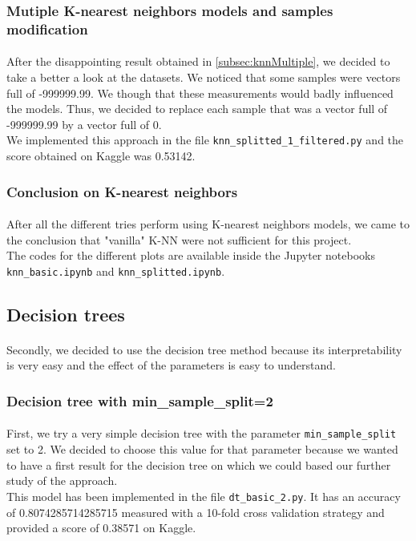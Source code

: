 \documentclass[a4paper, 11pt, oneside]{article}
\begin{document}
\subsubsection{Mutiple K-nearest neighbors models and samples modification}
\paragraph{}After the disappointing result obtained in \ref{subsec:knnMultiple}, we decided to take a better a look at the datasets. We noticed that some samples were vectors full of -999999.99. We though that these measurements would badly influenced the models. Thus, we decided to replace each sample that was a vector full of -999999.99 by a vector full of 0.\\
We implemented this approach in the file \texttt{knn\_splitted\_1\_filtered.py} and the score obtained on Kaggle was 0.53142.

\subsubsection{Conclusion on K-nearest neighbors}
\paragraph{}After all the different tries perform using K-nearest neighbors models, we came to the conclusion that "vanilla" K-NN were not sufficient for this project.\\
The codes for the different plots are available inside the Jupyter notebooks \texttt{knn\_basic.ipynb} and \texttt{knn\_splitted.ipynb}.


\subsection{Decision trees}\label{subsec:dt}
\paragraph{}Secondly, we decided to use the decision tree method because its interpretability is very easy and the effect of the parameters is easy to understand.

\subsubsection{Decision tree with min\_sample\_split=2}
\paragraph{}First, we try a very simple decision tree with the parameter \texttt{min\_sample\_split} set to 2. We decided to choose this value for that parameter because we wanted to have a first result for the decision tree on which we could based our further study of the approach.\\
This model has been implemented in the file \texttt{dt\_basic\_2.py}. It has an accuracy of 0.8074285714285715 measured with a 10-fold cross validation strategy and provided a score of 0.38571 on Kaggle.
\end{document}
